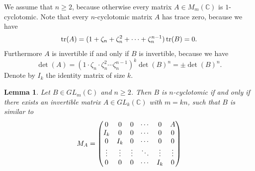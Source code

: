 \documentclass[12pt]{amsart}
\newtheorem{lem}[thm]{Lemma}
\theoremstyle{definition}
\theoremstyle{remark}
\newcommand{\C}{\mathbb{C}}
\newcommand{\tr}{\mathop{\rm tr}}
\begin{document}
We assume that $n\ge 2$, because otherwise every matrix $A\in M_m(\C)$ is $1$-cyclotomic. Note that every
$n$-cyclotomic matrix $A$ has trace zero, because we have
\[
\tr (A)=(1+\zeta_n+\zeta_n^2+\cdots +\zeta_n^{n-1})\tr (B)=0.
\]  
Furthermore $A$ is invertible if and only if $B$ is invertible, because we have
\[
\det(A)=(1\cdot \zeta_n\cdot \zeta_n^2\cdots \zeta_n^{n-1})^k\det(B)^n=\pm \det(B)^n.
\]  
Denote by $I_k$ the identity matrix of size $k$.

\begin{lem}\label{5.3}
Let $B\in GL_m(\C)$ and $n\ge 2$. Then $B$ is $n$-cyclotomic if and only if there exists an
invertible matrix $A\in GL_k(\C)$ with $m=kn$, such that $B$ is similar to
\[
M_A=  
\begin{pmatrix}
0 & 0 & 0 & \cdots & 0 & A \cr
I_k & 0 & 0 & \cdots & 0 & 0 \cr
0 & I_k & 0 & \cdots & 0 & 0 \cr
\vdots & \vdots & \vdots & \ddots & \vdots & \vdots \cr
0 & 0 & 0 & \cdots & I_k & 0 
\end{pmatrix}  
\]  
\end{lem}  
\end{document}

